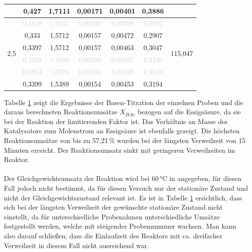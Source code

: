 \documentclass[12pt,liststotoc]{report}
\begin{document}
\begin{table}[htbp]
\begin{tabular}{ccccccc}
          & 0,427 & 1,7111 & 0,00171 & 0,00401 & 0,3886 &  \\
    \midrule
    \multirow{6}[2]{*}{2,5} & \textcolor{lightgray}{0,4819} & \textcolor{lightgray}{1,9242} & \textcolor{lightgray}{0,00192} & \textcolor{lightgray}{0,00399} & \textcolor{lightgray}{0,3997} & \multirow{6}[2]{*}{115,047} \\
          & 0,333 & 1,5712 & 0,00157 & 0,00472 & 0,2907 &  \\
          & 0,3397 & 1,5712 & 0,00157 & 0,00463 & 0,3047 &  \\
          & \textcolor{lightgray}{0,3429} & \textcolor{lightgray}{1,4986} & \textcolor{lightgray}{0,00150} & \textcolor{lightgray}{0,00437} & \textcolor{lightgray}{0,3430} &  \\
          & \textcolor{lightgray}{0,3863} & \textcolor{lightgray}{1,6578} & \textcolor{lightgray}{0,00166} & \textcolor{lightgray}{0,00429} & \textcolor{lightgray}{0,3549} &  \\
          & 0,3399 & 1,5389 & 0,00154 & 0,00453 & 0,3194 &  \\
    \bottomrule
    \end{tabular}%
  \label{tab:Umsatzzusammenfassung2}%
\end{table}%

Tabelle \ref{tab:Umsatzzusammenfassung2} zeigt die Ergebnisse der Basen-Titration der einzelnen Proben und die daraus berechneten Reaktionsumsätze $X_{HAc}$ bezogen auf die Essigsäsure, da sie bei der Reaktion der limitierenden Faktor ist. Das Verhältnis an Masse des Katalysators zum Molenstrom an Essigsäure ist ebenfalls gezeigt. Die höchsten Reaktionsumsätze von bis zu 57,21\,\% wurden bei der längsten Verweilzeit von 15 Minuten erreicht. Der Reaktionsumsatz sinkt mit geringeren Verweilzeiten im Reaktor. 
\\
\\
Der Gleichgewichtsumsatz der Reaktion wird bei 60\,°C in \cite{kirbacslar2001esterification} angegeben, für diesen Fall jedoch nicht bestimmt, da für diesen Versuch nur der stationäre Zustand und nicht der Gleichgewichtszustand relevant ist. Es ist in Tabelle \ref{tab:Umsatzzusammenfassung2} ersichtlich, dass sich bei der längsten Verweilzeit der gewünschte stationäre Zustand nicht einstellt, da für unterschiedliche Probenahmen unterschiedliche Umsätze festgestellt werden, welche mit steigender Probennummer wachsen. Man kann also darauf schließen, dass die Einlaufzeit des Reaktors mit ca. dreifacher Verweilzeit in diesem Fall nicht ausreichend war.
\end{document}
